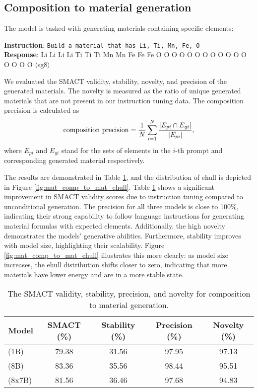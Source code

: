 \subsection{Composition to material generation}\label{sec:comp_to_mat}
The model is tasked with generating materials containing specific elements:
\begin{example}
\noindent\textbf{Instruction}: \texttt{Build a material that has Li, Ti, Mn, Fe, O}\\
\noindent\textbf{Response}: \material{} Li Li Li Li Ti Ti Ti Mn Mn Fe Fe Fe O O O O O O O O O O O O O O O O 
 $\langle$sg8$ \rangle$\ematerial{}
\end{example}
We evaluated the SMACT validity, stability, novelty, and precision of the generated materials. The novelty is measured as the ratio of unique generated materials that are not present in our instruction tuning data. The composition precision is calculated as 
\begin{equation}
{\rm composition\ precision} = \frac{1}{N} \sum_{i=1}^N \frac{\lvert E_{pi}\cap E_{gi}\rvert}{\lvert E_{pi}\rvert},
\label{eqn:mat_compt_to_mat_precision}
\end{equation}
where $E_{pi}$ and $E_{gi}$ stand for the sets of elements in the $i$-th prompt and corresponding generated material respectively.

The results are demonstrated in Table \ref{tab:mat_comp_to_mat}, and the distribution of ehull is depicted in Figure \ref{fig:mat_comp_to_mat_ehull}. Table \ref{tab:mat_comp_to_mat} shows a significant improvement in SMACT validity scores due to instruction tuning compared to unconditional generation. The precision for all three models is close to 100\%, indicating their strong capability to follow language instructions for generating material formulas with expected elements. Additionally, the high novelty demonstrates the models' generative abilities. Furthermore, stability improves with model size, highlighting their scalability. Figure \ref{fig:mat_comp_to_mat_ehull} illustrates this more clearly: as model size increases, the ehull distribution shifts closer to zero, indicating that more materials have lower energy and are in a more stable state. 
\begin{table}[!htbp]
\centering
\begin{tabular}{lcccc}
\toprule
Model & SMACT (\%) & Stability (\%) & Precision (\%) & Novelty (\%)\\
\midrule
\ourM{} (1B) & 79.38 & 31.56 & 97.95 & 97.13 \\
\ourM{} (8B) & 83.36 & 35.56 & 98.44 & 95.51 \\
\ourM{} (8x7B) & 81.56 & 36.46 & 97.68 & 94.83 \\
\bottomrule
\end{tabular}
\caption{The SMACT validity, stability, precision, and novelty for composition to material generation.}
\label{tab:mat_comp_to_mat}
\end{table}

